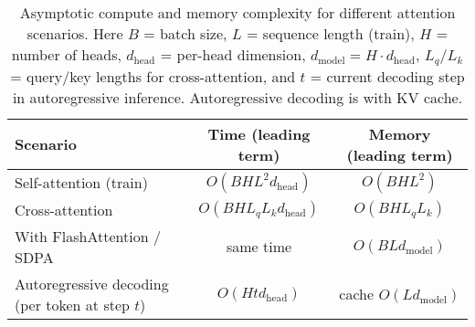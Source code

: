 \documentclass[11pt]{article}  %
\begin{document}
\begin{table}[h]
\centering
\renewcommand{\arraystretch}{1.2}
\begin{tabular}{@{}lcc@{}}
\toprule
\textbf{Scenario} & \textbf{Time (leading term)} & \textbf{Memory (leading term)} \\
\midrule
Self-attention (train) & $O\!\left(BHL^{2}d_{\text{head}}\right)$ & $O\!\left(BHL^{2}\right)$ \\
Cross-attention & $O\!\left(BHL_{q}L_{k}d_{\text{head}}\right)$ & $O\!\left(BHL_{q}L_{k}\right)$ \\
With FlashAttention / SDPA & same time & $O\!\left(BLd_{\text{model}}\right)$ \\
Autoregressive decoding (per token at step $t$) & $O\!\left(Htd_{\text{head}}\right)$ & cache $O\!\left(Ld_{\text{model}}\right)$ \\
\bottomrule
\end{tabular}
\caption{Asymptotic compute and memory complexity for different attention scenarios. 
Here $B$ = batch size, $L$ = sequence length (train), $H$ = number of heads, $d_{\text{head}}$ = per-head dimension, $d_{\text{model}} = H \cdot d_{\text{head}}$, $L_q$/$L_k$ = query/key lengths for cross-attention, and $t$ = current decoding step in autoregressive inference. Autoregressive decoding is with KV cache.}
\end{table}
\end{document}
